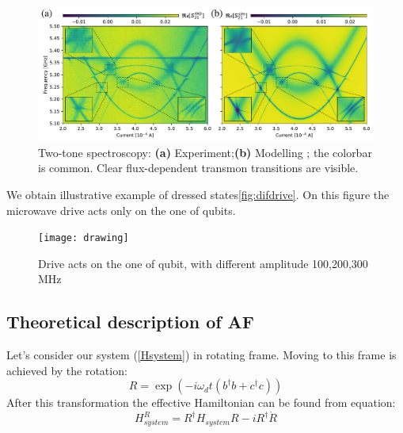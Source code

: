 \documentclass[%
 aip,
 amsmath,amssymb,
 reprint,%
]{revtex4-1}
\begin{document}
\begin{figure}
	\centering
	\includegraphics[width=\linewidth]{main_picture}
	\caption{Two-tone spectroscopy: \textbf{(a)} Experiment;\textbf{(b)} Modelling ; the colorbar is common.  Clear flux-dependent transmon transitions are visible.}
	\label{fig:two-tone}
\end{figure}

We obtain illustrative example of dressed states\autoref{fig:difdrive}. On this figure the microwave drive acts only on the one of qubits. 
\begin{figure}[h]
	\centering
	\texttt{[image: drawing]}
	\caption{Drive acts on the one of qubit, with different amplitude 100,200,300 MHz}
	\label{fig:difdrive}
\end{figure}


\subsection{Theoretical description of AF}
Let's consider our system (\autoref{Hsystem}) in rotating frame. Moving to this frame is achieved by the rotation:
\begin{equation}
R = \exp(-i\omega_d t (b^{\dagger}b+c^{\dagger}c))
\end{equation}  
After this transformation the effective Hamiltonian can be found from equation:
\begin{equation}
H_{system}^R = R^{\dagger}H_{system}R-iR^{\dagger}\dot{R}
\end{equation}
\end{document}
